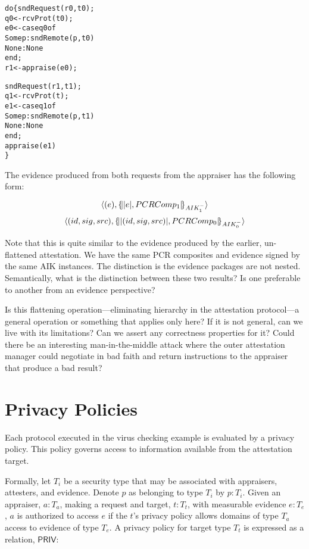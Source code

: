 \documentclass[10pt]{article}
\begin{document}
\begin{alltt}
  do \{ sndRequest(r0,t0);
       q0 <- rcvProt(t0);
       e0 <- case q0 of
               Some p : sndRemote(p,t0)
               None : None
             end;
       r1 <- appraise(e0);
       
       sndRequest(r1,t1);
       q1 <- rcvProt(t);
       e1 <- case q1 of
               Some p : sndRemote(p,t1)
               None : None
             end;
       appraise(e1)
  \}
\end{alltt}

The evidence produced from both requests from the appraiser has the
following form:

\[\langle (e),\{\!\lvert \lvert e \rvert,PCRComp_1\rvert\!\}_{AIK_1^{-}}\rangle\]
\[\langle (id,sig,src),\{\!\lvert \lvert (id,sig,src) \rvert,PCRComp_0\rvert\!\}_{AIK_0^{-}}\rangle\]

Note that this is quite similar to the evidence produced by the
earlier, un-flattened attestation.  We have the same PCR composites
and evidence signed by the same AIK instances.  The distinction is the
evidence packages are not nested.  Semantically, what is the
distinction between these two results?  Is one preferable to another
from an evidence perspective?

Is this flattening operation---eliminating hierarchy in the
attestation protocol---a general operation or something that applies
only here?  If it is not general, can we live with its limitations?
Can we assert any correctness properties for it?  Could there be an
interesting man-in-the-middle attack where the outer attestation
manager could negotiate in bad faith and return instructions to the
appraiser that produce a bad result?

\section*{Privacy Policies}

Each protocol executed in the virus checking example is evaluated by a
privacy policy.  This policy governs access to information available
from the attestation target.  

Formally, let $T_i$ be a security type that may be associated with
appraisers, attesters, and evidence.  Denote $p$ as
belonging to type $T_i$ by $p:T_i$.  Given an appraiser, $a:T_a$,
making a request and target, $t:T_t$, with measurable evidence
$e:T_e$, $a$ is authorized to access $e$ if the $t$'s privacy policy
allows domains of type $T_a$ access to evidence of type $T_e$. A
privacy policy for target type $T_t$ is expressed as a relation,
$\mathsf{PRIV}$:
\end{document}
